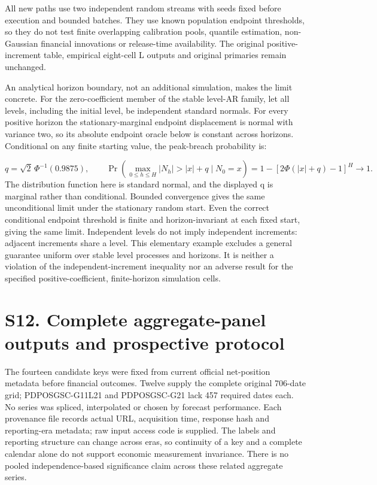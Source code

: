 \documentclass[11pt,a4paper]{article}
\begin{document}
\endgroup
All new paths use two independent random streams with seeds fixed before execution and bounded batches. They use known population endpoint thresholds, so they do not test finite overlapping calibration pools, quantile estimation, non-Gaussian financial innovations or release-time availability. The original positive-increment table, empirical eight-cell L outputs and original primaries remain unchanged.

An analytical horizon boundary, not an additional simulation, makes the limit concrete. For the zero-coefficient member of the stable level-AR family, let all levels, including the initial level, be independent standard normals. For every positive horizon the stationary-marginal endpoint displacement is normal with variance two, so its absolute endpoint oracle below is constant across horizons. Conditional on any finite starting value, the peak-breach probability is:

\[
q=\sqrt2\,\Phi^{-1}(0.9875),\qquad\Pr\!\left(\max_{0\le h\le H}|N_h|>|x|+q\mid N_0=x\right)=1-\left[2\Phi(|x|+q)-1\right]^H\longrightarrow1.
\]
The distribution function here is standard normal, and the displayed q is marginal rather than conditional. Bounded convergence gives the same unconditional limit under the stationary random start. Even the correct conditional endpoint threshold is finite and horizon-invariant at each fixed start, giving the same limit. Independent levels do not imply independent increments: adjacent increments share a level. This elementary example excludes a general guarantee uniform over stable level processes and horizons. It is neither a violation of the independent-increment inequality nor an adverse result for the specified positive-coefficient, finite-horizon simulation cells.

\section*{S12. Complete aggregate-panel outputs and prospective protocol}
The fourteen candidate keys were fixed from current official net-position metadata before financial outcomes. Twelve supply the complete original 706-date grid; PDPOSGSC-G11L21 and PDPOSGSC-G21 lack 457 required dates each. No series was spliced, interpolated or chosen by forecast performance. Each provenance file records actual URL, acquisition time, response hash and reporting-era metadata; raw input access code is supplied. The labels and reporting structure can change across eras, so continuity of a key and a complete calendar alone do not support economic measurement invariance. There is no pooled independence-based significance claim across these related aggregate series.
\end{document}
